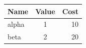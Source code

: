 \begin{tabular}{|l|c|r|}
\hline
Name & Value & Cost \\
\hline
alpha & 1 & 10 \\
beta & 2 & 20 \\
\hline
\end{tabular}

